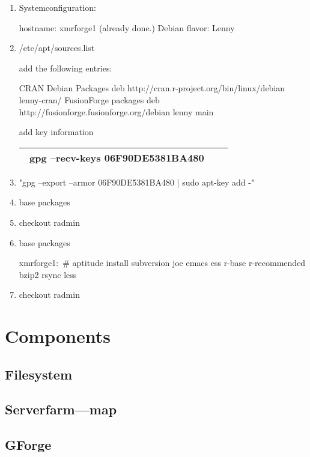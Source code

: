 \documentclass[a4paper]{article}
\begin{document}
\begin{enumerate}
	\item Systemconfiguration:
	
	hostname: xmrforge1 (already done.)
\newline	Debian flavor: Lenny
	
	\item /etc/apt/sources.list

	add the following entries:	
	

	 CRAN Debian Packages
deb http://cran.r-project.org/bin/linux/debian lenny-cran/
	 FusionForge packages
deb http://fusionforge.fusionforge.org/debian lenny main


add key information

\begin{tabular}{|r|r|}
\hline
\ {gpg --recv-keys 06F90DE5381BA480 }\
\\
\hline
\end{tabular}


	\item "gpg --export --armor 06F90DE5381BA480 | sudo apt-key add -"

	
	\item base packages
	
	\item checkout radmin


	\item base packages

xmrforge1:~# aptitude install subversion joe emacs ess r-base r-recommended bzip2 rsync less

	\item checkout radmin

\end{enumerate}


\section{Components}
\label{sec:registration}

\subsection{Filesystem}
\subsection{Serverfarm---map}
\subsection{GForge}
\end{document}
